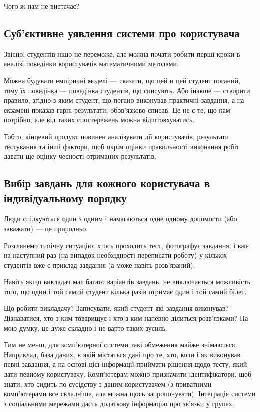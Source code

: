 Чого ж нам не вистачає?

\subsection{Суб’єктивнe уявлення системи про користувача}
Звісно, студентів ніщо не переможе, але можна почати робити перші кроки в
аналізі поведінки користувачів математичними методами.

Можна будувати емпіричні моделі --- сказати, що цей и цей студент поганий, тому
їх поведінка --- поведінка студентів, що списують.
Або інакше --- створити правило, згідно з яким студент, що погано виконував
практичні завдання, а на екзамені показав гарні результати, обов’язково списав.
Це не є те, що нам потрібно, але від таких спостережень можна відштовхуватись.

Тобто, кінцевий продукт повинен аналізувати дії користувачів, результати
тестування та інші фактори, щоб окрім оцінки правильності виконання робіт
давати ще оцінку чесності отриманих результатів.

\subsection{Вибір завдань для кожного користувача в індивідуальному порядку}
Люди спілкуються один з одним і намагаються одне одному допомогти
(або заважати) --- це природньо.

Розглянемо типічну ситуацію: хтось проходить тест, фотографує завдання, і вже
на наступний раз (на випадок необхідності переписати роботу) у кількох
студентів вже є приклад завдання (а може навіть розв’язаний).

Навіть якщо викладач має багато варіантів завдань, не виключається можливість
того, що один і той самий студент кілька разів отримає один і той самий білет.

Що робити викладачу? Записувати, який студент які завдання виконував?
Дізнаватися, хто з ким товарищує і хто з ким напевно ділиться розв’язками?
На мою думку, це дуже складно і не варто таких зусиль.

Тим не менш, для комп’ютерної системи такі обмеження майже знімаються.
Наприклад, база даних, в якій містяться дані про те, хто, коли і як виконував
певні завдання, а на основі цієї інформації приймати рішення щодо тесту, який
дати певному користувачу. Комп’ютерам можно призначити ідентифікатори, щоб
знати, хто сидить по сусідству з даним користувачем (з приватними комп’ютерами
все складніше, але можна щось запропонувати). Інтеграція системи з соціальними
мережами дасть додаткову інформацію про зв’язки у групах.

